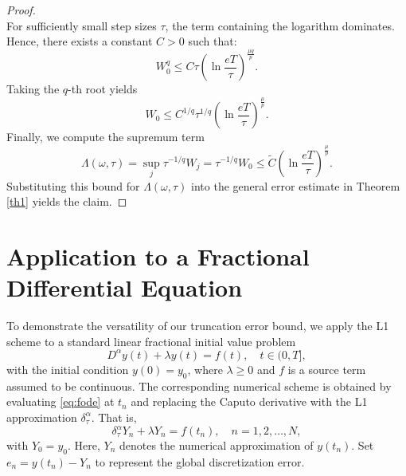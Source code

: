 \documentclass[12pt,a4paper]{article}
\theoremstyle{definition}
\begin{document}
\begin{proof}
\begin{equation}
\end{equation}
For sufficiently small step sizes $\tau$, the term containing the logarithm dominates. Hence, there exists a constant $C > 0$ such that:
\begin{equation}
    W_0^q \le C \tau \left(\ln \frac{eT}{\tau}\right)^{\frac{\mu q}{p}}.
\end{equation}
Taking the $q$-th root yields
\begin{equation}
    W_0 \le C^{1/q} \tau^{1/q} \left(\ln \frac{eT}{\tau}\right)^{\frac{\mu}{p}}.
\end{equation}
Finally, we compute the supremum term
\begin{equation}
    \Lambda(\omega, \tau) = \sup_j \tau^{-1/q} W_j = \tau^{-1/q} W_0 \le \tilde{C} \left(\ln \frac{eT}{\tau}\right)^{\frac{\mu}{p}}.
\end{equation}
Substituting this bound for $\Lambda(\omega, \tau)$ into the general error estimate in Theorem \ref{th1} yields the claim.
\end{proof}

\section{Application to a Fractional Differential Equation}
To demonstrate the versatility of our truncation error bound, we apply the L1 scheme to a standard linear fractional initial value problem
\begin{equation}\label{eq:fode}
    D^\alpha y(t) + \lambda y(t) = f(t), \quad t \in (0,T],
\end{equation}
with the initial condition $y(0) = y_0$, where $\lambda \ge 0$ and $f$ is a source term assumed to be continuous. The corresponding numerical scheme is obtained by evaluating \eqref{eq:fode} at $t_n$ and replacing the Caputo derivative with the L1 approximation $\delta_\tau^\alpha$. That is,
\begin{equation} \label{eq:fode_discrete}
    \delta_\tau^\alpha Y_n + \lambda Y_n = f(t_n), \quad n = 1, 2, \dots, N,
\end{equation}
with $Y_0 = y_0$. Here, $Y_n$ denotes the numerical approximation of $y(t_n)$. Set $e_n = y(t_n) - Y_n$ to represent the global discretization error.
\end{document}
